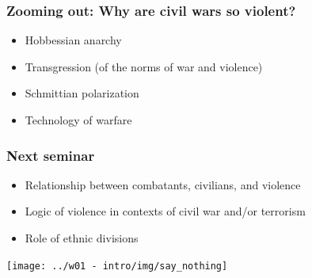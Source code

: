 \documentclass[utf8, xcolor=dvipsnames, handout]{beamer}
\begin{document}
\begin{frame}
\frametitle{Zooming out: Why are civil wars so violent?}
\centering

\begin{itemize}
  \item Hobbessian anarchy
  \item Transgression (of the norms of war and violence)
  \item Schmittian polarization
  \item Technology of warfare
\end{itemize}

\end{frame}

\begin{frame}
\frametitle{Next seminar}
\centering

\begin{minipage}{0.59\textwidth}\centering
\begin{itemize}
  \item Relationship between combatants, civilians, and violence
  \item Logic of violence in contexts of civil war and/or terrorism
  \item Role of ethnic divisions
\end{itemize}
\end{minipage}\hfill
\begin{minipage}{0.35\textwidth}\centering
\texttt{[image: ../w01 - intro/img/say\_nothing]}\\
\end{minipage}

\end{frame}
\end{document}
